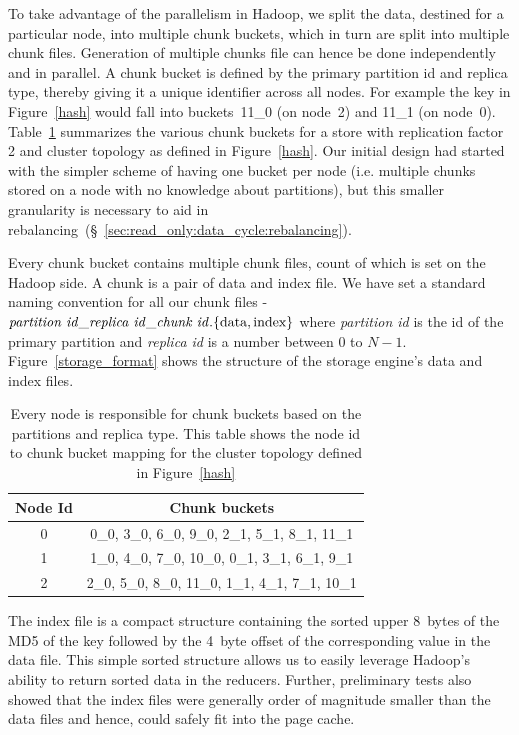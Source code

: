 To take advantage of the parallelism in Hadoop, we split the data, 
destined for a particular node, into multiple chunk buckets, 
which in turn are split into multiple chunk files. Generation of 
multiple chunks file can hence be done independently and in parallel. 
A chunk bucket is defined by the primary partition id and replica type,
thereby giving it a unique identifier across all nodes. For example the key in 
Figure~\ref{hash} would fall into buckets~11\_0 (on node~2) and 
11\_1 (on node~0). Table~\ref{tab:node_to_chunk} summarizes the
various chunk buckets for a store with replication factor 2 and cluster
topology as defined in Figure~\ref{hash}. Our initial design 
had started with the simpler scheme of having one bucket per node 
(i.e. multiple chunks stored on a node with no knowledge about partitions), 
but this smaller granularity is necessary to aid in rebalancing~(\S~\ref{sec:read_only:data_cycle:rebalancing}).

Every chunk bucket contains multiple chunk files, count of which is
set on the Hadoop side. A chunk is a pair of data and 
index file. We have set a standard naming convention for all 
our chunk files - 
$\text{\emph{partition id}}\_\text{\emph{replica
id}}\_\text{\emph{chunk id}}.\{\text{data},\text{index}\}$ where
\emph{partition id} is the id of the primary partition and
\emph{replica id} is a number between 0 to $N-1$. 
Figure~\ref{storage_format} shows the structure of the storage
engine's data and index files. 

\begin{table}
\begin{center}
    \begin{tabular}{ | c | c | }
    \hline
    Node Id & Chunk buckets \\ \hline
    0 &  0\_0, 3\_0, 6\_0, 9\_0,      2\_1, 5\_1, 8\_1, 11\_1	\\
   1 &   1\_0, 4\_0, 7\_0, 10\_0,      0\_1, 3\_1, 6\_1, 9\_1		\\
   2 &    2\_0, 5\_0, 8\_0, 11\_0,    1\_1, 4\_1, 7\_1, 10\_1		\\
\hline
    \end{tabular}
\end{center}
 	\caption{Every \projectname{} node is responsible for chunk buckets based on the partitions and replica type. This table shows the node id to chunk bucket mapping for the cluster topology defined in Figure~\ref{hash}}
 	\label{tab:node_to_chunk}
\end{table}

The index file is a compact structure containing the sorted upper
8~bytes of the MD5 of the key followed by the 4~byte offset of the
corresponding value in the data file. This simple sorted structure
allows us to easily leverage Hadoop's ability to return sorted data
in the reducers. Further, preliminary tests also showed that the
index files were generally order of magnitude smaller than the data
files and hence, could safely fit into the page cache.

